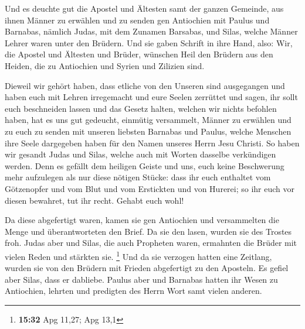  Und es deuchte gut die Apostel und Ältesten samt der
ganzen Gemeinde, aus ihnen Männer zu erwählen und zu senden gen
Antiochien mit Paulus und Barnabas, nämlich Judas, mit dem Zunamen
Barsabas, und Silas, welche Männer Lehrer waren unter den Brüdern.
 Und sie gaben Schrift in ihre Hand, also: Wir, die
Apostel und Ältesten und Brüder, wünschen Heil den Brüdern aus den
Heiden, die zu Antiochien und Syrien und Zilizien sind.

 Dieweil wir gehört haben, dass etliche von den Unseren
sind ausgegangen und haben euch mit Lehren irregemacht und eure Seelen
zerrüttet und sagen, ihr sollt euch beschneiden lassen und das Gesetz
halten, welchen wir nichts befohlen haben,  hat es uns
gut gedeucht, einmütig versammelt, Männer zu erwählen und zu euch zu
senden mit unseren liebsten Barnabas und Paulus,  welche
Menschen ihre Seele dargegeben haben für den Namen unseres Herrn Jesu
Christi.  So haben wir gesandt Judas und Silas, welche
auch mit Worten dasselbe verkündigen werden.  Denn es
gefällt dem heiligen Geiste und uns, euch keine Beschwerung mehr
aufzulegen als nur diese nötigen Stücke:  dass ihr euch
enthaltet vom Götzenopfer und vom Blut und vom Erstickten und von
Hurerei; so ihr euch vor diesen bewahret, tut ihr recht. Gehabt euch
wohl!

 Da diese abgefertigt waren, kamen sie gen Antiochien und
versammelten die Menge und überantworteten den Brief.  Da
sie den lasen, wurden sie des Trostes froh.  Judas aber
und Silas, die auch Propheten waren, ermahnten die Brüder mit vielen
Reden und stärkten sie. \footnote{\textbf{15:32} Apg 11,27; Apg 13,1}
 Und da sie verzogen hatten eine Zeitlang, wurden sie von
den Brüdern mit Frieden abgefertigt zu den Aposteln.  Es
gefiel aber Silas, dass er dabliebe.  Paulus aber und
Barnabas hatten ihr Wesen zu Antiochien, lehrten und predigten des Herrn
Wort samt vielen anderen.

